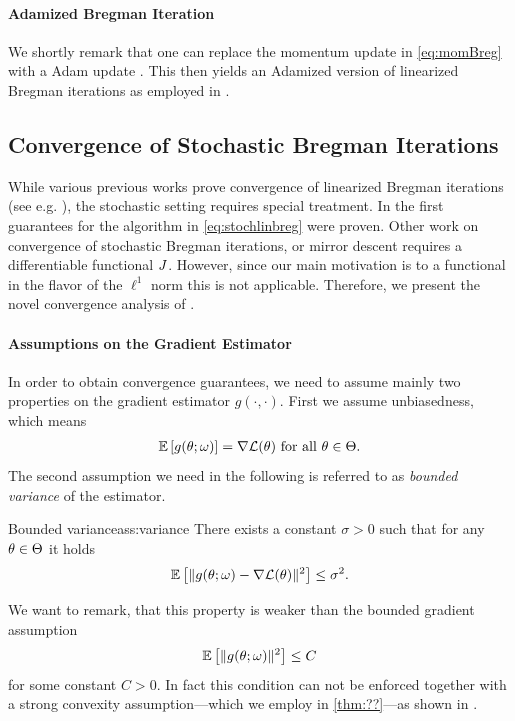 \paragraph{Adamized Bregman Iteration} We shortly remark that one can replace the momentum update in \cref{eq:momBreg} with a Adam update \cite{kingma2014adam}. This then yields an Adamized version of linearized Bregman iterations as employed in \cite{bungert2022bregman}.


\subsection{Convergence of Stochastic Bregman Iterations}\label{sec:ConvAna}
%
%
While various previous works prove convergence of linearized Bregman iterations (see e.g. \cite{osher2005iterative, cai2009convergence}), the stochastic setting requires special treatment. In \cite{bungert2022bregman} the first guarantees for the algorithm in \cref{eq:stochlinbreg} were proven. Other work on convergence of stochastic Bregman iterations, or mirror descent \cite{dragomir2021fast, hanzely2021fastest, zhang2018convergence, d2021stochastic, aubin2022mirror} requires a differentiable functional $J$. However, since our main motivation is to a functional in the flavor of the $\ell^1$ norm this is not applicable. Therefore, we present the novel convergence analysis of \cite{bungert2022bregman}.
%
%
\paragraph{Assumptions on the Gradient Estimator}
%
In order to obtain convergence guarantees, we need to assume mainly two properties on the gradient estimator $g(\cdot,\cdot)$. First we assume unbiasedness, which means
%
\begin{align*}
\mathbb{E}\left[g(\theta;\omega)\right] = \nabla\mathcal{L}(\theta)\text{ for all }\theta\in\Theta.
\end{align*}
%
The second assumption we need in the following is referred to as \emph{bounded variance} of the estimator.
%
\begin{assumption}{Bounded variance}{ass:variance}
There exists a constant $\sigma>0$ such that for any $\theta\in\Theta$ it holds
\begin{align}
    \mathbb{E}\left[\|g(\theta;\omega)-\nabla\mathcal{L}(\theta)\|^2\right] \leq \sigma^2.
\end{align}
\end{assumption}
%
%
\begin{remark}{}{}
We want to remark, that this property is weaker than the bounded gradient assumption
%
\begin{align*}
\mathbb{E}\left[\|g(\theta;\omega)\|^2\right] \leq C
\end{align*}
%
for some constant $C>0$. In fact this condition can not be enforced together with a strong convexity assumption---which we employ in \cref{thm:??}---as shown in \cite{pmlr-v80-nguyen18c}.
\end{remark}
